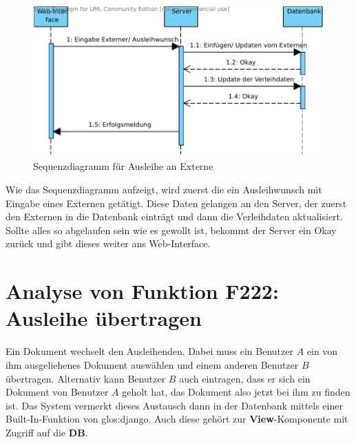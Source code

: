 \begin{figure}[H]
\begin{center}
\includegraphics[width=0.8\linewidth]{bilder/Seq-Ausleihe.pdf}
\caption{Sequenzdiagramm für Ausleihe an Externe}
\label{fig:221}
\end{center}
\end{figure}
Wie das Sequenzdiagramm aufzeigt, wird zuerst die ein Ausleihwunsch mit Eingabe eines Externen getätigt. Diese Daten gelangen an den Server, der zuerst den Externen in die Datenbank einträgt und dann die Verleihdaten aktualisiert. Sollte alles so abgelaufen sein wie es gewollt ist, bekommt der Server ein Okay zurück und gibt dieses weiter ans Web-Interface.

\section{Analyse von Funktion F222: Ausleihe übertragen}
\label{f:222}
Ein Dokument wechselt den Ausleihenden. Dabei muss ein Benutzer $A$ ein von ihm 
ausgeliehenes Dokument auswählen und einem anderen Benutzer $B$ übertragen. 
Alternativ kann Benutzer $B$ auch eintragen, dass er sich ein Dokument von 
Benutzer $A$ geholt hat, das Dokument also jetzt bei ihm zu finden ist. Das 
System vermerkt dieses Austausch dann in der Datenbank mittels einer 
Built-In-Funktion von \gls{glos:django}. Auch diese gehört zur 
\textbf{View}-Komponente mit Zugriff auf die \textbf{DB}.

